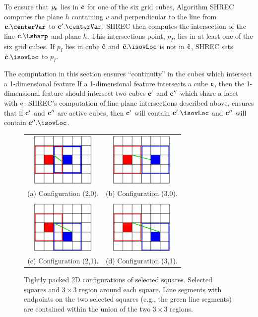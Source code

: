 To ensure that $p_{{\tilde{\mathbf{c}}}}$ lies in ${\tilde{\mathbf{c}}}$ for one of the six grid cubes,
Algorithm SHREC computes the plane $h$ containing $v$
and perpendicular to the line from $\cb.\centerVar$ to $\cb'.\centerVar$.
SHREC then computes the intersection of the line $\cb.\Lsharp$ and plane $h$.
This intersections point, $p_I$, lies in at least one of the six grid cubes.
If $p_I$ lies in cube ${\tilde{\mathbf{c}}}$ and $\tcb.\isovLoc$ is not in ${\tilde{\mathbf{c}}}$,
SHREC sets $\tcb.\isovLoc$ to $p_I$.

The computation in this section ensures ``continuity'' in the cubes
which intersect a 1-dimensional feature
If a 1-dimensional feature intersects a cube $\mathbf{c}$,
then the 1-dimensional feature should intersect two cubes $\mathbf{c}'$ and $\mathbf{c}''$
which share a facet with $\mathbf{c}$.
SHREC's computation of line-plane intersections described above,
ensures that if $\mathbf{c}'$ and $\mathbf{c}''$ are active cubes,
then $\mathbf{c}'$ will contain $\cb'.\isovLoc$ and 
$\mathbf{c}''$ will contain $\cb''.\isovLoc$.


\begin{figure}
\centering
\begin{tabular}{cc}
\includegraphics[width=1.2in]{images/config2D_2_0.eps} \qquad &
\qquad
\includegraphics[width=1.2in]{images/config2D_3_0.eps} \\
(a) Configuration (2,0). & (b) Configuration (3,0). \\
\\
\includegraphics[width=1.2in]{images/config2D_2_1.eps}
\qquad &
\qquad
\includegraphics[width=1.2in]{images/config2D_3_1.eps} \\
(c) Configuration (2,1). & (d) Configuration (3,1).
\end{tabular}
\caption{Tightly packed 2D configurations of selected squares.
Selected squares and $3 \times 3$ region around each square.
Line segments with endpoints on the two selected squares 
(e.g., the green line segments) are contained
within the union of the two $3 \times 3$ regions.}
\label{fig:packed2D}
\end{figure}

